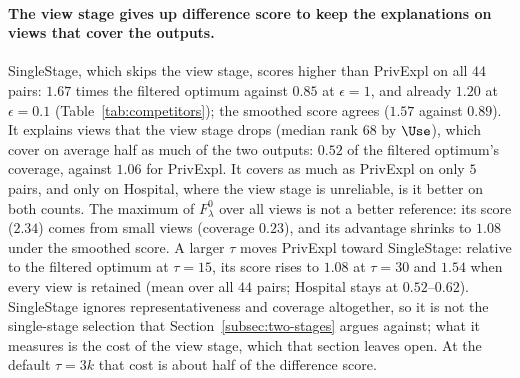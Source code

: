 \paragraph{The view stage gives up difference score to keep the explanations on views that cover the outputs.}
\textsf{SingleStage}, which skips the view stage, scores higher than \textsf{PrivExpl} on all $44$ pairs: $1.67$ times the filtered optimum against $0.85$ at $\epsilon=1$, and already $1.20$ at $\epsilon=0.1$ (Table~\ref{tab:competitors}); the smoothed score agrees ($1.57$ against $0.89$).
It explains views that the view stage drops (median rank $68$ by $\Use$), which cover on average half as much of the two outputs: $0.52$ of the filtered optimum's coverage, against $1.06$ for \textsf{PrivExpl}.
It covers as much as \textsf{PrivExpl} on only $5$ pairs, and only on Hospital, where the view stage is unreliable, is it better on both counts.
The maximum of $F^0_\lambda$ over all views is not a better reference: its score ($2.34$) comes from small views (coverage $0.23$), and its advantage shrinks to $1.08$ under the smoothed score.
A larger $\tau$ moves \textsf{PrivExpl} toward \textsf{SingleStage}: relative to the filtered optimum at $\tau=15$, its score rises to $1.08$ at $\tau=30$ and $1.54$ when every view is retained (mean over all $44$ pairs; Hospital stays at $0.52$--$0.62$).
\textsf{SingleStage} ignores representativeness and coverage altogether, so it is not the single-stage selection that Section~\ref{subsec:two-stages} argues against; what it measures is the cost of the view stage, which that section leaves open.
At the default $\tau=3k$ that cost is about half of the difference score.

